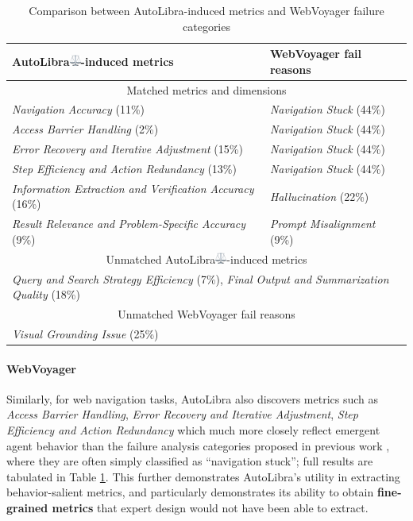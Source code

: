 \begin{table}[!h]
\centering
\begin{tabular}{ll}
    \toprule
    AutoLibra\protect\includegraphics[height=1em]{figs/scale.png}-induced metrics & WebVoyager fail reasons\\
    \midrule
    \multicolumn{2}{c}{Matched metrics and dimensions}\\\midrule
    \textit{Navigation Accuracy} (11\%) & \textit{Navigation Stuck} (44\%) \\ 
    \textit{Access Barrier Handling} (2\%) & \textit{Navigation Stuck} (44\%)\\
    \textit{Error Recovery and Iterative Adjustment} (15\%) & \textit{Navigation Stuck} (44\%)\\
    \textit{Step Efficiency and Action Redundancy} (13\%) & \textit{Navigation Stuck} (44\%)\\ 
    \textit{Information Extraction and Verification Accuracy} (16\%) & \textit{Hallucination} (22\%)\\
    \textit{Result Relevance and Problem-Specific Accuracy} (9\%) & \textit{Prompt Misalignment} (9\%)\\
    \midrule
    \multicolumn{2}{c}{Unmatched AutoLibra\protect\includegraphics[height=1em]{figs/scale.png}-induced metrics}\\\midrule
     \multicolumn{2}{C{0.8\textwidth}}{\textit{Query and Search Strategy Efficiency} (7\%), \textit{Final Output and Summarization Quality} (18\%)}} \\ \midrule
     \multicolumn{2}{c}{Unmatched WebVoyager fail reasons}\\\midrule
     \multicolumn{2}{C{0.8\textwidth}}{\textit{Visual Grounding Issue} (25\%)} \\\bottomrule
\end{tabular}
\caption{Comparison between AutoLibra-induced metrics and WebVoyager failure categories}
\label{tab:lens_wv}
\end{table}

\paragraph{WebVoyager} Similarly, for web navigation tasks, AutoLibra also discovers metrics such as \textit{Access Barrier Handling}, \textit{Error Recovery and Iterative Adjustment}, \textit{Step Efficiency and Action Redundancy} which much more closely reflect emergent agent behavior than the failure analysis categories proposed in previous work \citep{he2024webvoyager,zhou2024proposeragentevaluatorpaeautonomousskilldiscovery}, where they are often simply classified as ``navigation stuck''; full results are tabulated in Table \ref{tab:lens_wv}. This further demonstrates AutoLibra's utility in extracting behavior-salient metrics, and particularly demonstrates its ability to obtain \textbf{fine-grained metrics} that expert design would not have been able to extract. 



